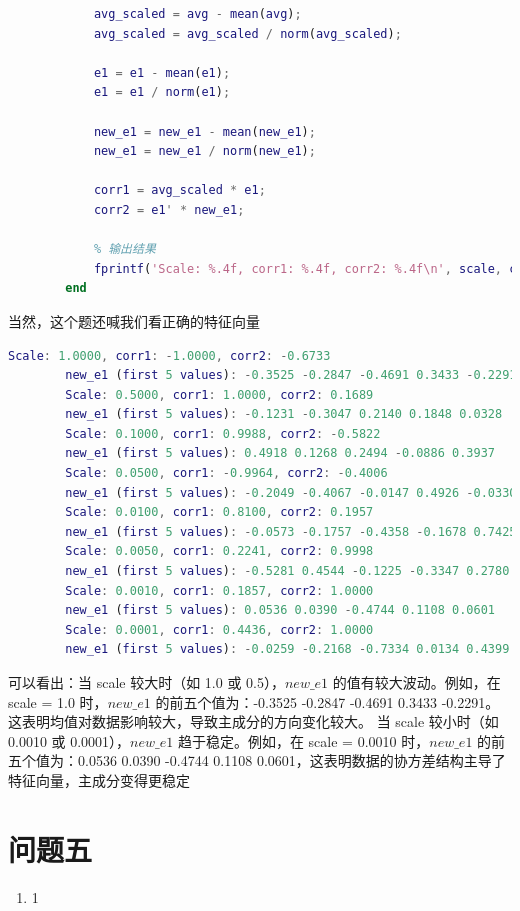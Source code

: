 \documentclass[answers]{exam}  %
\begin{document}
\begin{enumerate}[label=\alph*.]
\begin{lstlisting}[language=matlab]
            % 计算相关性
            avg_scaled = avg - mean(avg);
            avg_scaled = avg_scaled / norm(avg_scaled);
            
            e1 = e1 - mean(e1);
            e1 = e1 / norm(e1);
            
            new_e1 = new_e1 - mean(new_e1);
            new_e1 = new_e1 / norm(new_e1);
            
            corr1 = avg_scaled * e1;
            corr2 = e1' * new_e1;
            
            % 输出结果
            fprintf('Scale: %.4f, corr1: %.4f, corr2: %.4f\n', scale, corr1, corr2);
        end
    \end{lstlisting}
    当然，这个题还喊我们看正确的特征向量
    \begin{lstlisting}[language=matlab]
        Scale: 1.0000, corr1: -1.0000, corr2: -0.6733
        new_e1 (first 5 values): -0.3525 -0.2847 -0.4691 0.3433 -0.2291
        Scale: 0.5000, corr1: 1.0000, corr2: 0.1689
        new_e1 (first 5 values): -0.1231 -0.3047 0.2140 0.1848 0.0328
        Scale: 0.1000, corr1: 0.9988, corr2: -0.5822
        new_e1 (first 5 values): 0.4918 0.1268 0.2494 -0.0886 0.3937
        Scale: 0.0500, corr1: -0.9964, corr2: -0.4006
        new_e1 (first 5 values): -0.2049 -0.4067 -0.0147 0.4926 -0.0330
        Scale: 0.0100, corr1: 0.8100, corr2: 0.1957
        new_e1 (first 5 values): -0.0573 -0.1757 -0.4358 -0.1678 0.7425
        Scale: 0.0050, corr1: 0.2241, corr2: 0.9998
        new_e1 (first 5 values): -0.5281 0.4544 -0.1225 -0.3347 0.2780
        Scale: 0.0010, corr1: 0.1857, corr2: 1.0000
        new_e1 (first 5 values): 0.0536 0.0390 -0.4744 0.1108 0.0601
        Scale: 0.0001, corr1: 0.4436, corr2: 1.0000
        new_e1 (first 5 values): -0.0259 -0.2168 -0.7334 0.0134 0.4399
    \end{lstlisting}
    可以看出：当 scale 较大时（如 1.0 或 0.5），$new\_e1$ 的值有较大波动。例如，在 scale = 1.0 时，$new\_e1$ 的前五个值为：-0.3525 -0.2847 -0.4691 0.3433 -0.2291。这表明均值对数据影响较大，导致主成分的方向变化较大。
    当 scale 较小时（如 0.0010 或 0.0001），$new\_e1$ 趋于稳定。例如，在 scale = 0.0010 时，$new\_e1$ 的前五个值为：0.0536 0.0390 -0.4744 0.1108 0.0601，这表明数据的协方差结构主导了特征向量，主成分变得更稳定
\end{enumerate}

\section{问题五}
\begin{enumerate}[label=\alph*.] 
    \item 1
\end{enumerate}
\end{document}
